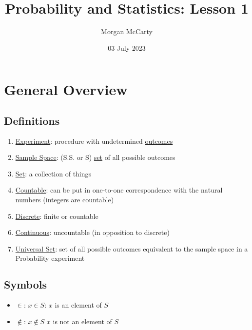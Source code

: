 \documentclass[12pt]{article}
\title{Probability and Statistics: Lesson 1}
\author{Morgan McCarty}
\date{03 July 2023}
\begin{document}
    \maketitle

    \section{General Overview}
        \subsection{Definitions}
            \begin{enumerate}
                \item \underline{Experiment}: procedure with undetermined \underline{outcomes}
                \item \underline{Sample Space}: (S.S. or S) \underline{set} of all possible outcomes
                \item \underline{Set}: a collection of things
                \item \underline{Countable}: can be put in one-to-one correspondence with the natural numbers (integers are countable)
                \item \underline{Discrete}: finite or countable
                \item \underline{Continuous}: uncountable (in opposition to discrete)
                \item \underline{Universal Set}: set of all possible outcomes equivalent to the sample space in a Probability experiment
            \end{enumerate}

        \subsection{Symbols}
            \begin{itemize}
                \item $\in$: $x \in S$: $x$ is an element of $S$
                \item $\notin$: $x \notin S$ $x$ is not an element of $S$
            \end{itemize}
        
\end{document}
